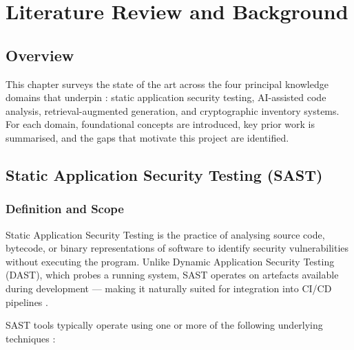 \chapter{Literature Review and Background}
\label{ch:literature}

\section{Overview}

This chapter surveys the state of the art across the four principal knowledge domains that underpin \ACRQA{}: static application security testing, AI-assisted code analysis, retrieval-augmented generation, and cryptographic inventory systems. For each domain, foundational concepts are introduced, key prior work is summarised, and the gaps that motivate this project are identified.

\section{Static Application Security Testing (SAST)}
\label{sec:sast_background}

\subsection{Definition and Scope}

Static Application Security Testing is the practice of analysing source code, bytecode, or binary representations of software to identify security vulnerabilities without executing the program. Unlike Dynamic Application Security Testing (DAST), which probes a running system, SAST operates on artefacts available during development --- making it naturally suited for integration into CI/CD pipelines \cite{chess2004static}.

SAST tools typically operate using one or more of the following underlying techniques \cite{chess2004static,livshits2005finding}:

